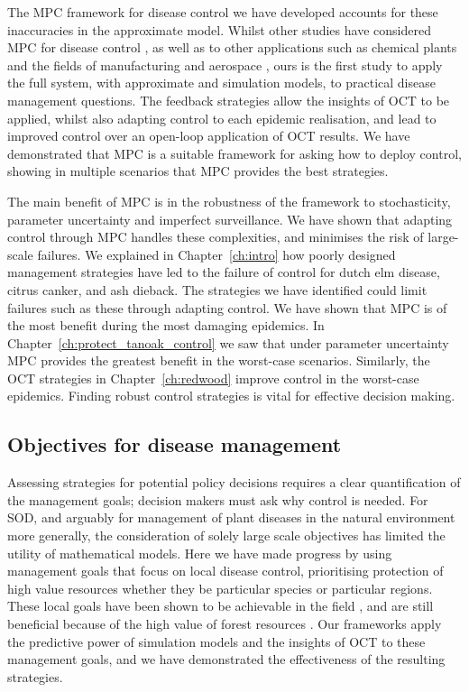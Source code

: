 The MPC framework for disease control we have developed accounts for these inaccuracies in the approximate model. Whilst other studies have considered MPC for disease control \citep{selley_dynamic_2015}, as well as to other applications such as chemical plants and the fields of manufacturing and aerospace \citep{qin_survey_2003}, ours is the first study to apply the full system, with approximate and simulation models, to practical disease management questions. The feedback strategies allow the insights of OCT to be applied, whilst also adapting control to each epidemic realisation, and lead to improved control over an open-loop application of OCT results. We have demonstrated that MPC is a suitable framework for asking how to deploy control, showing in multiple scenarios that MPC provides the best strategies.

The main benefit of MPC is in the robustness of the framework to stochasticity, parameter uncertainty and imperfect surveillance. We have shown that adapting control through MPC handles these complexities, and minimises the risk of large-scale failures. We explained in Chapter~\ref{ch:intro} how poorly designed management strategies have led to the failure of control for dutch elm disease, citrus canker, and ash dieback. The strategies we have identified could limit failures such as these through adapting control. We have shown that MPC is of the most benefit during the most damaging epidemics. In Chapter~\ref{ch:protect_tanoak_control} we saw that under parameter uncertainty MPC provides the greatest benefit in the worst-case scenarios. Similarly, the OCT strategies in Chapter~\ref{ch:redwood} improve control in the worst-case epidemics. Finding robust control strategies is vital for effective decision making.

\subsection{Objectives for disease management}

Assessing strategies for potential policy decisions requires a clear quantification of the management goals; decision makers must ask why control is needed. For SOD, and arguably for management of plant diseases in the natural environment more generally, the consideration of solely large scale objectives has limited the utility of mathematical models. Here we have made progress by using management goals that focus on local disease control, prioritising protection of high value resources whether they be particular species or particular regions. These local goals have been shown to be achievable in the field \citep{hansen_efficacy_2019}, and are still beneficial because of the high value of forest resources \citep{green_future}. Our frameworks apply the predictive power of simulation models and the insights of OCT to these management goals, and we have demonstrated the effectiveness of the resulting strategies.

